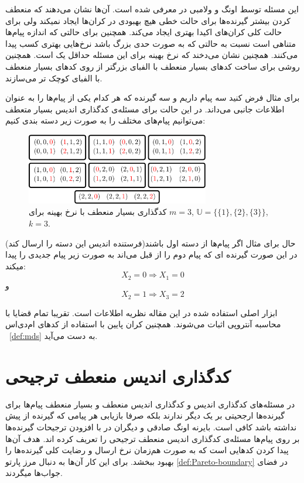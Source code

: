این مسئله توسط اونگ و ولامبی در
\cite{verypliable}
معرفی شده است. آن‌ها نشان می‌دهند که منعطف کردن بیشتر گیرنده‌ها برای حالت خطی هیچ بهبودی در کران‌ها ایجاد نمیکند ولی برای حالت کلی کران‌های اکیدا بهتری ایجاد می‌کند. همچنین برای حالتی که اندازه پیام‌ها متناهی است نسبت به حالتی که به صورت حدی بزرگ باشد نرخ‌هایی بهتری کسب پیدا می‌کنند. همچنین نشان می‌دخند که نرخ بهینه برای این مسئله حداقل یک است. همچنین روشی برای ساخت کدهای بسیار منعطف با الفبای بزرگتر از روی کدهای بسیار منعطف با الفبای کوچک تر می‌سازند.

برای مثال فرض کنید سه پیام داریم و سه گیرنده که هر کدام یکی از پیام‌ها را به عنوان اطلاعات جانبی می‌داند. در این حالت برای مسئله‌ی کدگذاری اندیس بسیار متعطف می‌توانیم پیام‌های مختلف را به صورت زیر دسته بندی کنیم:
\begin{figure}[H]
	\centering
	\includegraphics[width=8cm]{figs/chapter4/Alpha3}
	\caption{
		کدگذاری بسیار منعطف با نرخ بهینه برای
		$m=3$, 
		$\mathbb{U} = \big\{ \{1\}, \{2\}, \{3\} \big\}$,
		 $k=3$.
		 }
	\label{fig:eg:0}
\end{figure}
حال برای مثال اگر پیام‌ها از دسته اول باشند(فرستنده اندیس این دسته را ارسال کند) در این صورت گیرنده ای که پیام دوم را از قبل می‌اند به صورت زیر پیام جدیدی را پیدا میکند:
$$X_2 = 0 \Rightarrow X_1 = 0$$
و
$$X_2 = 1 \Rightarrow X_3 = 2$$

ابزار اصلی استفاده شده در این مقاله نظریه اطلاعات است. تقریبا تمام قضایا با محاسبه آنتروپی اثبات می‌شوند. همچنین کران پایین با استفاده از
 کدهای ام‌دی‌اس
 ~\ref{def:mds}
به دست می‌آید.


\section{کدگذاری اندیس منعطف ترجیحی}
در مسئله‌های کدگذاری اندیس و کدگذاری اندیس منعطف و بسیار منعطف پیام‌ها برای گیرنده‌ها ارجحیتی بر یک دیگر ندارند بلکه صرفا بازیابی هر پیامی که گیرنده از پیش نداشته باشد کافی است. بایرنه اونگ صادقی و دیگران در
\cite{byrne2023preferential}
با افزودن ترجیحات گیرنده‌ها بر روی پیام‌ها مسئله‌ی کدگذاری اندیس منعطف ترجیحی را تعریف کرده اند. هدف آن‌ها پیدا کردن کدهایی است که به صورت هم‌زمان نرخ ارسال و رضایت کلی گیرنده‌ها را بهبود ببخشد. برای این کار آن‌ها به دنبال مرز	پارتو
\ref{def:Pareto-boundary}
 در فضای جواب‌ها میگردند.
 
